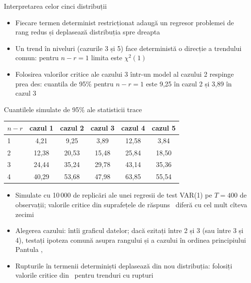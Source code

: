 \begin{frame}{Interpretarea celor cinci distribuții}
\itemsize{\small}
\begin{itemize}
    \item Fiecare termen determinist restricționat adaugă un regresor problemei de rang redus și deplasează distribuția spre dreapta
    \item Un trend în niveluri (cazurile 3 și 5) face deterministă o direcție a trendului comun: pentru $n - r = 1$ limita este $\chi^2(1)$
    \item Folosirea valorilor critice ale cazului 3 într-un model al cazului 2 respinge prea des: cuantila de 95\% pentru $n - r = 1$ este 9{,}25 în cazul 2 și 3{,}89 în cazul 3
\end{itemize}
\end{frame}

\begin{frame}{Cuantilele simulate de 95\% ale statisticii trace}
\itemsize{\small}
\begin{center}
\footnotesize
\begin{tabular}{lccccc}
\toprule
$n - r$ & cazul 1 & cazul 2 & cazul 3 & cazul 4 & cazul 5 \\
\midrule
1 & 4{,}21 & 9{,}25 & 3{,}89 & 12{,}58 & 3{,}84 \\
2 & 12{,}38 & 20{,}53 & 15{,}48 & 25{,}84 & 18{,}50 \\
3 & 24{,}44 & 35{,}24 & 29{,}78 & 43{,}14 & 35{,}36 \\
4 & 40{,}29 & 53{,}68 & 47{,}98 & 63{,}85 & 55{,}54 \\
\bottomrule
\end{tabular}
\end{center}
\begin{itemize}
    \item Simulate cu 10\,000 de replicări ale unei regresii de test VAR(1) pe $T = 400$ de observații; valorile critice din suprafețele de răspuns \ diferă cu cel mult cîteva zecimi
    \item Alegerea cazului: întîi graficul datelor; dacă ezitați între 2 și 3 (sau între 3 și 4), testați ipoteza comună asupra rangului și a cazului în ordinea principiului Pantula , 
    \item Rupturile în termenii determiniști deplasează din nou distribuția: folosiți valorile critice din \ pentru trenduri cu rupturi
\end{itemize}
\end{frame}

